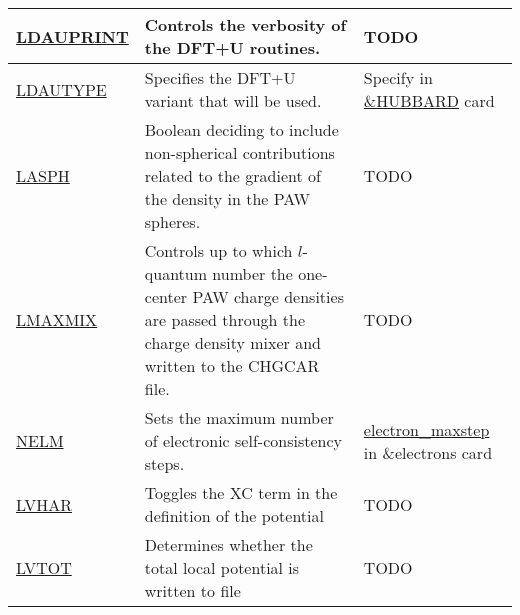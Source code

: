 \documentclass[12pt]{article}
\begin{document}
\begin{center}
\begin{table}[ht]
\begin{tabularx}{\linewidth}{|>{\RaggedRight}p{2.5cm}|x|x|}
 \href{https://www.vasp.at/wiki/index.php/LDAUPRINT}{LDAUPRINT} &
 Controls the verbosity of the DFT+U routines. &
 TODO \\ \hline
 
 \href{https://www.vasp.at/wiki/index.php/LDAUTYPE}{LDAUTYPE} &
 Specifies the DFT+U variant that will be used. &
 Specify in \href{https://www.quantum-espresso.org/Doc/INPUT_PW.html#idm1699}{\&HUBBARD} card \\ \hline
 
 \href{https://www.vasp.at/wiki/index.php/LASPH}{LASPH} &
 Boolean deciding to include non-spherical contributions related to the gradient of the density in the PAW spheres. &
 TODO \\ \hline
 
 \href{template.url}{LMAXMIX} &
 Controls up to which $l$-quantum number the one-center PAW charge densities are passed through the charge density mixer and written to the CHGCAR file. &
 TODO \\ \hline
 
 \href{https://www.vasp.at/wiki/index.php/NELM}{NELM} &
 Sets the maximum number of electronic self-consistency steps. &
 \href{https://www.quantum-espresso.org/Doc/INPUT_PW.html#idm78}{electron\_maxstep} in \&electrons card \\ \hline
 
 \href{https://www.vasp.at/wiki/index.php/LVHAR}{LVHAR} &
 Toggles the XC term in the definition of the potential &
 TODO \\ \hline
 
 \href{https://www.vasp.at/wiki/index.php/LVTOT}{LVTOT} &
 Determines whether the total local potential is written to file &
 TODO \\ \hline
 
\end{tabularx}
\end{table}
\end{center}
\end{document}
